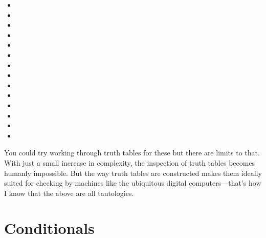 {\small
\begin{itemize}
 \setlength{\itemsep}{1em}

\item {}

\item {}

\item {}

\item {}

\item {}

\item {}

\item {}

\item {}

\item {}

\item {}

\item {}

\item {}

\item {}

\item {}

\end{itemize}
}

You could try working through truth tables for these but there are limits to 
that.  With just a small increase in complexity, the inspection of truth tables 
becomes humanly impossible. But the way truth tables are constructed makes them 
ideally suited for checking by machines like the ubiquitous digital 
computers---that's how I know that the above are all tautologies.










\section{Conditionals}\label{sec:conditional}


